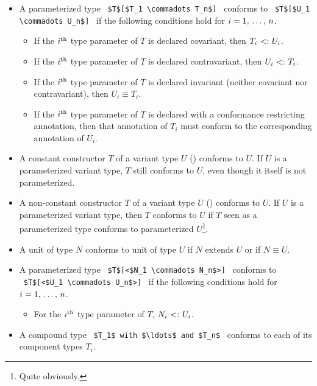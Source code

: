 \begin{itemize}
  \item A parameterized type ~\lstinline!$T$[$T_1 \commadots T_n$]!~ conforms to ~\lstinline!$T$[$U_1 \commadots U_n$]!~ if the following conditions hold for $i = 1 ,\, \ldots ,\, n$.
    \begin{itemize}
      \item If the $i^{\mbox{\scriptsize th}}$ type parameter of $T$ is declared covariant, then $T_i \conforms U_i$.
      \item If the $i^{\mbox{\scriptsize th}}$ type parameter of $T$ is declared contravariant, then $U_i \conforms T_i$.
      \item If the $i^{\mbox{\scriptsize th}}$ type parameter of $T$ is declared invariant (neither covariant nor contravariant), then $U_i \equiv T_i$.
      \item If the $i^{\mbox{\scriptsize th}}$ type parameter of $T$ is declared with a conformance restricting annotation, then that annotation of $T_i$ must conform to the corresponding annotation of $U_i$. 
    \end{itemize}
    
  \item A constant constructor $T$ of a variant type $U$ () conforms to $U$. If $U$ is a parameterized variant type, $T$ still conforms to $U$, even though it itself is not parameterized. 
  
  \item A non-constant constructor $T$ of a variant type $U$ () conforms to $U$. If $U$ is a parameterized variant type, then $T$ conforms to $U$ if $T$ seen as a parameterized type conforms to parameterized $U$\footnote{Quite obviously.}. 

  \item A unit of type $N$ conforms to unit of type $U$ if $N$ extends $U$ or if $N \equiv U$. 

  \item A parameterized type ~\lstinline!$T$[<$N_1 \commadots N_n$>]!~ conforms to ~\lstinline!$T$[<$U_1 \commadots U_n$>]!~ if the following conditions hold for $i = 1 ,\, \ldots ,\, n$.
    \begin{itemize}
      \item For the $i^{\mbox{\scriptsize th}}$ type parameter of $T$, $N_i \conforms U_i$.
    \end{itemize}

  \item A compound type ~\lstinline!$T_1$ with $\ldots$ and $T_n$!~ conforms to each of its component types $T_i$.
  

\end{itemize}
